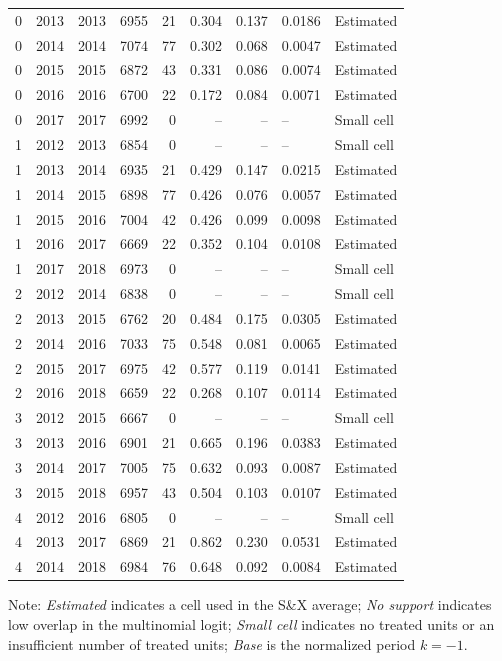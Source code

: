 \begin{longtable}{rrrrrrrll}
0 & 2013 & 2013 & 6955 & 21 & 0.304 & 0.137 & 0.0186 & Estimated \\
0 & 2014 & 2014 & 7074 & 77 & 0.302 & 0.068 & 0.0047 & Estimated \\
0 & 2015 & 2015 & 6872 & 43 & 0.331 & 0.086 & 0.0074 & Estimated \\
0 & 2016 & 2016 & 6700 & 22 & 0.172 & 0.084 & 0.0071 & Estimated \\
0 & 2017 & 2017 & 6992 & 0 & -- & -- & -- & Small cell \\
1 & 2012 & 2013 & 6854 & 0 & -- & -- & -- & Small cell \\
1 & 2013 & 2014 & 6935 & 21 & 0.429 & 0.147 & 0.0215 & Estimated \\
1 & 2014 & 2015 & 6898 & 77 & 0.426 & 0.076 & 0.0057 & Estimated \\
1 & 2015 & 2016 & 7004 & 42 & 0.426 & 0.099 & 0.0098 & Estimated \\
1 & 2016 & 2017 & 6669 & 22 & 0.352 & 0.104 & 0.0108 & Estimated \\
1 & 2017 & 2018 & 6973 & 0 & -- & -- & -- & Small cell \\
2 & 2012 & 2014 & 6838 & 0 & -- & -- & -- & Small cell \\
2 & 2013 & 2015 & 6762 & 20 & 0.484 & 0.175 & 0.0305 & Estimated \\
2 & 2014 & 2016 & 7033 & 75 & 0.548 & 0.081 & 0.0065 & Estimated \\
2 & 2015 & 2017 & 6975 & 42 & 0.577 & 0.119 & 0.0141 & Estimated \\
2 & 2016 & 2018 & 6659 & 22 & 0.268 & 0.107 & 0.0114 & Estimated \\
3 & 2012 & 2015 & 6667 & 0 & -- & -- & -- & Small cell \\
3 & 2013 & 2016 & 6901 & 21 & 0.665 & 0.196 & 0.0383 & Estimated \\
3 & 2014 & 2017 & 7005 & 75 & 0.632 & 0.093 & 0.0087 & Estimated \\
3 & 2015 & 2018 & 6957 & 43 & 0.504 & 0.103 & 0.0107 & Estimated \\
4 & 2012 & 2016 & 6805 & 0 & -- & -- & -- & Small cell \\
4 & 2013 & 2017 & 6869 & 21 & 0.862 & 0.230 & 0.0531 & Estimated \\
4 & 2014 & 2018 & 6984 & 76 & 0.648 & 0.092 & 0.0084 & Estimated \\
\end{longtable}
\vspace{-0.35cm}
\noindent\footnotesize Note: \textit{Estimated} indicates a cell used in the S\&X average; \textit{No support} indicates low overlap in the multinomial logit; \textit{Small cell} indicates no treated units or an insufficient number of treated units; \textit{Base} is the normalized period \(k=-1\).
\par\endgroup



